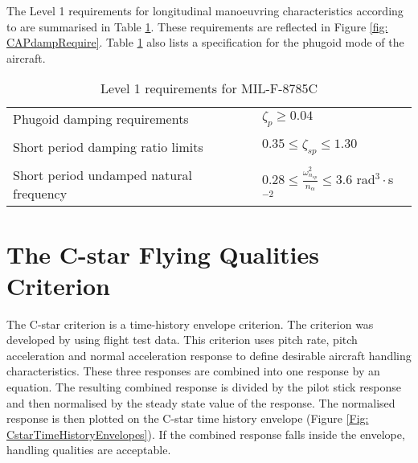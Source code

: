\documentclass{report}
\begin{document}


The Level 1 requirements for longitudinal manoeuvring characteristics according to  are summarised in Table \ref{tab:LevelIMIL-F-8785C}.  These requirements are reflected in Figure \ref{fig: CAPdampRequire}.  Table \ref{tab:LevelIMIL-F-8785C} also lists a specification for the phugoid mode of the aircraft.

\begin{table}[htb]
	\caption{Level 1 requirements for MIL-F-8785C}
	
	\begin{center}
		\begin{tabular}{l l}
			\hline
			Phugoid damping requirements & $ \zeta_{p} \geq 0.04 $ \\ \\
			Short period damping ratio limits & $ 0.35 \leq \zeta_{sp} \leq 1.30 $ \\ \\
			Short period undamped natural frequency & $ 0.28 \leq \frac{\omega_{n_{sp}}^2}{n_\alpha} \leq 3.6$ rad$^3\cdot$s$^{-2}$ \\
			\hline
		\end{tabular}
	\end{center}

	\label{tab:LevelIMIL-F-8785C}
\end{table}

\section{The C-star Flying Qualities Criterion}\label{Sec: C-star}


The C-star criterion \citep{CstarCriterion} is a time-history envelope criterion.  The criterion was developed by using flight test data.  This criterion uses pitch rate, pitch acceleration and normal acceleration response to define desirable aircraft handling characteristics.  These three responses are combined into one response by an equation.  The resulting combined response is divided by the pilot stick response and then normalised by the steady state value of the response.  The normalised response is then plotted on the C-star time history envelope (Figure \ref{Fig: CstarTimeHistoryEnvelopes}).  If the combined response falls inside the envelope, handling qualities are acceptable.
\end{document}
